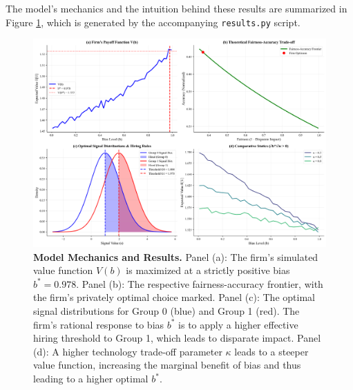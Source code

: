 The model's mechanics and the intuition behind these results are summarized in Figure \ref{fig:main_results}, which is generated by the accompanying \texttt{results.py} script.

\begin{figure}[H]
    \centering
    \includegraphics[width=\textwidth]{../figures/figure_1_model_mechanics.png}
    \caption[Model Mechanics and Results]{\textbf{Model Mechanics and Results.} 
    Panel (a): The firm's simulated value function $V(b)$ is maximized at a strictly positive bias $b^*=0.978$. 
    Panel (b): The respective fairness-accuracy frontier, with the firm's privately optimal choice marked. 
    Panel (c): The optimal signal distributions for Group 0 (blue) and Group 1 (red). The firm's rational response to bias $b^*$ is to apply a higher effective hiring threshold to Group 1, which leads to disparate impact.
    Panel (d): A higher technology trade-off parameter $\kappa$ leads to a steeper value function, increasing the marginal benefit of bias and thus leading to a higher optimal $b^*$.}
    \label{fig:main_results}
\end{figure}
